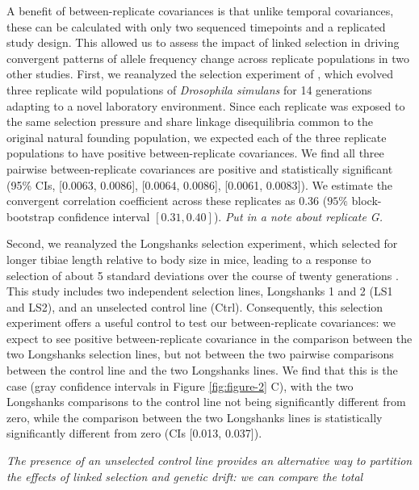 \documentclass[11pt]{article}
\newcommand{\vb}[1]{{\it \color{blue} #1}}
\begin{document}
A benefit of between-replicate covariances is that unlike temporal covariances,
these can be calculated with only two sequenced timepoints and a replicated
study design. This allowed us to assess the impact of linked selection in
driving convergent patterns of allele frequency change across replicate
populations in two other studies. First, we reanalyzed the selection experiment
of \textcite{Kelly2019-dc}, which evolved three replicate wild populations of
\emph{Drosophila simulans} for 14 generations adapting to a novel laboratory
environment. Since each replicate was exposed to the same selection pressure
and share linkage disequilibria common to the original natural founding
population, we expected each of the three replicate populations to have
positive between-replicate covariances. We find all three pairwise
between-replicate covariances are positive and statistically significant (95\%
CIs, [0.0063, 0.0086], [0.0064, 0.0086], [0.0061, 0.0083]). We estimate the
convergent correlation coefficient across these replicates as 0.36 ($95\%$
block-bootstrap confidence interval $[0.31, 0.40]$). \vb{Put in a note about
replicate G.}

Second, we reanalyzed the Longshanks selection experiment, which selected for
longer tibiae length relative to body size in mice, leading to a response to
selection of about 5 standard deviations over the course of twenty generations
\parencite{Castro2019-uk,Marchini2014-de}. This study includes two independent
selection lines, Longshanks 1 and 2 (LS1 and LS2), and an unselected control
line (Ctrl).  Consequently, this selection experiment offers a useful control
to test our between-replicate covariances: we expect to see positive
between-replicate covariance in the comparison between the two Longshanks
selection lines, but not between the two pairwise comparisons between the
control line and the two Longshanks lines. We find that this is the case (gray
confidence intervals in Figure \ref{fig:figure-2} C), with the two Longshanks
comparisons to the control line not being significantly different from zero,
while the comparison between the two Longshanks lines is statistically
significantly different from zero (CIs [0.013, 0.037]).

\vb{The presence of an unselected control line provides an alternative way to
  partition the effects of linked selection and genetic drift: we can compare
  the total 

}
\end{document}
